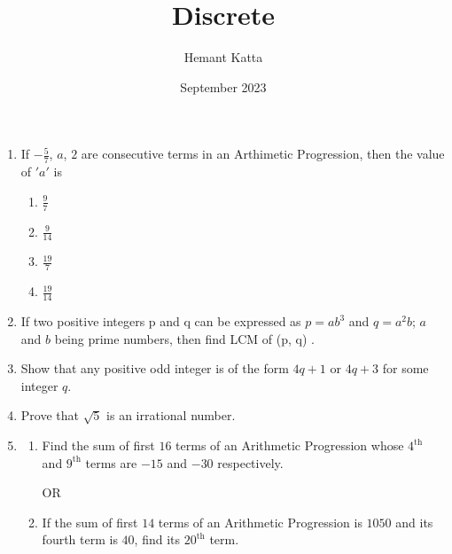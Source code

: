 \documentclass{article}
\title{Discrete}
\author{Hemant Katta}
\date{September 2023}
\begin{document}
\maketitle

\begin{enumerate}
    \item If $-\frac{5}{7}$, $a$, $2$ are consecutive terms in an Arthimetic Progression, then the value of $'a'$ is 
    \begin{enumerate}
        \item $\frac{9}{7}$
         \item $\frac{9}{14}$
          \item $\frac{19}{7}$
           \item $\frac{19}{14}$
    \end{enumerate}
    \item If two positive integers p and q can be expressed as $p = ab^3$ and $q = a^2b$; 
$a$ and $b$ being prime numbers, then find LCM of (p, q) . 

    \item Show that any positive odd integer is of the form $4q + 1$ or $4q + 3$ for some integer $q$. 
    \item Prove that $\sqrt{5}$ is an irrational number.
    \item
    \begin{enumerate}
    \item Find the sum of first $16$ terms of an Arithmetic Progression whose $4^{\text{th}}$ and $9^{\text{th}}$ terms are $-15$ and $-30$ respectively.
    \begin{center}
            OR
        \end{center} 
        \item If the sum of first $14$ terms of an Arithmetic Progression is $1050$ and its fourth term is $40$, find its $20^{\text{th}}$ term.
    \end{enumerate}


\end{enumerate}
\end{document}
